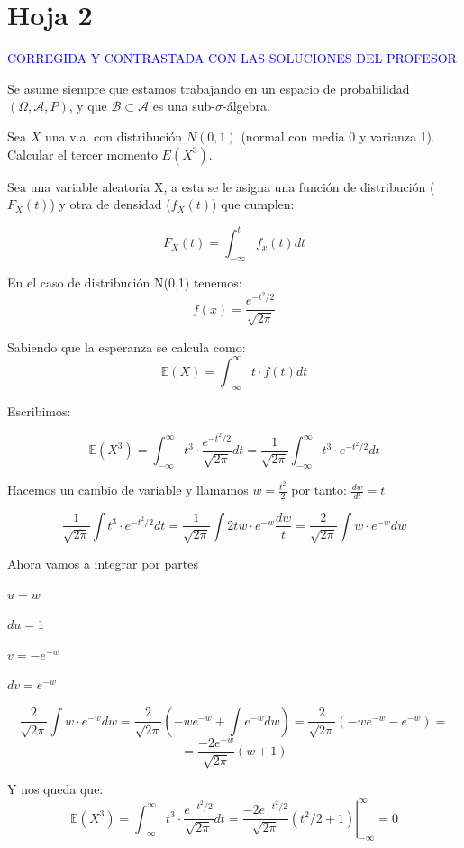 




\newpage
\section{Hoja 2}

\textcolor{blue}{CORREGIDA Y CONTRASTADA CON LAS SOLUCIONES DEL PROFESOR}

Se asume siempre que estamos trabajando en un espacio de probabilidad $(\Omega, \mathcal{A}, P)$,
y que  $\mathcal{B}\subset \mathcal{A}$ es una sub-$\sigma$-\'algebra.


\begin{problem}[1]Sea $X$ una v.a. con distribuci\'on $N(0,1)$ (normal con media 0 y varianza 1). 
Calcular el tercer momento $E(X^3)$.
\solution

\begin{expla}
Sea una variable aleatoria X, a esta se le asigna una función de distribución ($F_X(t)$) y otra de densidad ($f_X(t)$) que cumplen:

\[
F_X(t)=\int_{-\infty}^{t}f_x(t)dt
\]

En el caso de distribución N(0,1) tenemos:
\[
f(x)=\frac{e^{-t^2/2}}{\sqrt{2\pi}}
\]

Sabiendo que la esperanza se calcula como:
\[
\mathbb{E}(X)=\int_{-\infty}^{\infty}t\cdot f(t)dt
\]

Escribimos:
\end{expla}

\[
\mathbb{E}(X^3)=\int_{-\infty}^{\infty}t^3\cdot \frac{e^{-t^2/2}}{\sqrt{2\pi}}dt = \frac{1}{\sqrt{2\pi}}\int_{-\infty}^{\infty}t^3\cdot e^{-t^2/2}dt
\]

Hacemos un cambio de variable y llamamos $w=\frac{t^2}{2}$ por tanto: $\frac{dw}{dt}=t$

\[
\frac{1}{\sqrt{2\pi}}\int t^3\cdot e^{-t^2/2}dt = \frac{1}{\sqrt{2\pi}}\int 2tw\cdot e^{-w}\frac{dw}{t} = \frac{2}{\sqrt{2\pi}}\int w\cdot e^{-w}dw
\]

Ahora vamos a integrar por partes

$u=w$

$du=1$

$v=-e^{-w}$

$dv=e^{-w}$

\[
\frac{2}{\sqrt{2\pi}}\int w\cdot e^{-w}dw = \frac{2}{\sqrt{2\pi}}\left( -we^{-w}+\int e^{-w}dw \right) =\frac{2}{\sqrt{2\pi}}\left( -we^{-w}-e^{-w} \right)=
\]
\[
= \frac{-2e^{-w}}{\sqrt{2\pi}}(w+1)
\]

Y nos queda que:
\[
\mathbb{E}(X^3)=\int_{-\infty}^{\infty}t^3\cdot \frac{e^{-t^2/2}}{\sqrt{2\pi}}dt = \left.\frac{-2e^{-t^2/2}}{\sqrt{2\pi}}(t^2/2+1)\right|_{-\infty}^{\infty}=0
\]




\end{problem}


